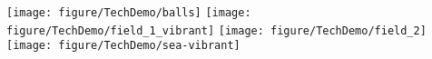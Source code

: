 \texttt{[image: figure/TechDemo/balls]}
\texttt{[image: figure/TechDemo/field\_1\_vibrant]}
\texttt{[image: figure/TechDemo/field\_2]}
\texttt{[image: figure/TechDemo/sea-vibrant]}